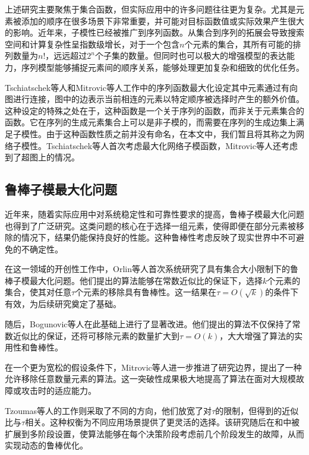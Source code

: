上述研究主要聚焦于集合函数，但实际应用中的许多问题往往更为复杂。尤其是元素被添加的顺序在很多场景下非常重要，并可能对目标函数值或实际效果产生很大的影响。近年来，子模性已经被推广到序列函数\cite{zhang2015string,tschiatschek2017selecting,streeter2008online,zhang2013near}。从集合到序列的拓展会导致搜索空间和计算复杂性呈指数级增长，对于一个包含$n$个元素的集合，其所有可能的排列数量为$n!$，远远超过$2^n$个子集的数量。但同时也可以极大的增强模型的表达能力，序列模型能够捕捉元素间的顺序关系，能够处理更加复杂和细致的优化任务。

Tschiatschek等人\cite{tschiatschek2017selecting}和Mitrovic等人\cite{mitrovic2018submodularity}工作中的序列函数最大化设定其中元素通过有向图进行连接，图中的边表示当前相连的元素以特定顺序被选择时产生的额外价值。这种设定的特殊之处在于，这种函数是一个关于序列的函数，而非关于元素集合的函数。它在序列的生成元素集合上可以是非子模的，而需要在序列的生成边集上满足子模性。由于这种函数性质之前并没有命名，在本文中，我们暂且将其称之为网络子模性。Tschiatschek等人\cite{tschiatschek2017selecting}首次考虑最大化网络子模函数，Mitrovic等人\cite{mitrovic2018submodularity}还考虑到了超图上的情况。

\subsection{鲁棒子模最大化问题}

近年来，随着实际应用中对系统稳定性和可靠性要求的提高，鲁棒子模最大化问题也得到了广泛研究。这类问题的核心在于选择一组元素，使得即便在部分元素被移除的情况下，结果仍能保持良好的性能。这种鲁棒性考虑反映了现实世界中不可避免的不确定性。

在这一领域的开创性工作中，Orlin等人\cite{orlin2018robust}首次系统研究了具有集合大小限制下的鲁棒子模最大化问题。他们提出的算法能够在常数近似比的保证下，选择$k$个元素的集合，使其对任意$\tau$个元素的移除具有鲁棒性。这一结果在$\tau = O(\sqrt{k})$的条件下有效，为后续研究奠定了基础。

随后，Bogunovic等人\cite{bogunovic2017robust}在此基础上进行了显著改进。他们提出的算法不仅保持了常数近似比的保证，还将可移除元素的数量扩大到$\tau = O(k)$，大大增强了算法的实用性和鲁棒性。

在一个更为宽松的假设条件下，Mitrovic等人\cite{mitrovic2017streaming}进一步推进了研究边界，提出了一种允许移除任意数量元素的算法。这一突破性成果极大地提高了算法在面对大规模故障或攻击时的适应能力。

Tzoumas等人的工作\cite{tzoumas2017resilient}则采取了不同的方向，他们放宽了对$\tau$的限制，但得到的近似比与$\tau$相关。这种权衡为不同应用场景提供了更灵活的选择。该研究随后在\cite{tzoumas2018resilient}和\cite{tzoumas2020robust}中被扩展到多阶段设置，使算法能够在每个决策阶段考虑前几个阶段发生的故障，从而实现动态的鲁棒优化。

